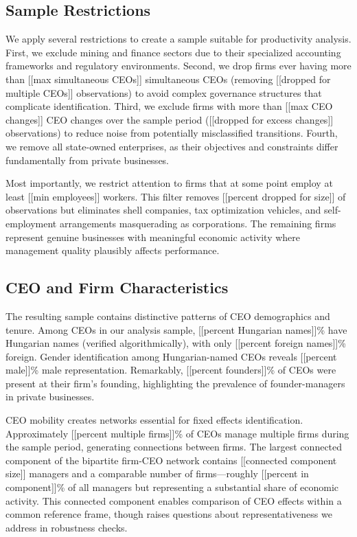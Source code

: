 \documentclass[11pt,a4paper]{article}
\begin{document}
\subsection{Sample Restrictions}

We apply several restrictions to create a sample suitable for productivity analysis. First, we exclude mining and finance sectors due to their specialized accounting frameworks and regulatory environments. Second, we drop firms ever having more than [[max simultaneous CEOs]] simultaneous CEOs (removing [[dropped for multiple CEOs]] observations) to avoid complex governance structures that complicate identification. Third, we exclude firms with more than [[max CEO changes]] CEO changes over the sample period ([[dropped for excess changes]] observations) to reduce noise from potentially misclassified transitions. Fourth, we remove all state-owned enterprises, as their objectives and constraints differ fundamentally from private businesses.

Most importantly, we restrict attention to firms that at some point employ at least [[min employees]] workers. This filter removes [[percent dropped for size]] of observations but eliminates shell companies, tax optimization vehicles, and self-employment arrangements masquerading as corporations. The remaining firms represent genuine businesses with meaningful economic activity where management quality plausibly affects performance.

\subsection{CEO and Firm Characteristics}

The resulting sample contains distinctive patterns of CEO demographics and tenure. Among CEOs in our analysis sample, [[percent Hungarian names]]\% have Hungarian names (verified algorithmically), with only [[percent foreign names]]\% foreign. Gender identification among Hungarian-named CEOs reveals [[percent male]]\% male representation. Remarkably, [[percent founders]]\% of CEOs were present at their firm's founding, highlighting the prevalence of founder-managers in private businesses.

CEO mobility creates networks essential for fixed effects identification. Approximately [[percent multiple firms]]\% of CEOs manage multiple firms during the sample period, generating connections between firms. The largest connected component of the bipartite firm-CEO network contains [[connected component size]] managers and a comparable number of firms—roughly [[percent in component]]\% of all managers but representing a substantial share of economic activity. This connected component enables comparison of CEO effects within a common reference frame, though raises questions about representativeness we address in robustness checks.
\end{document}
